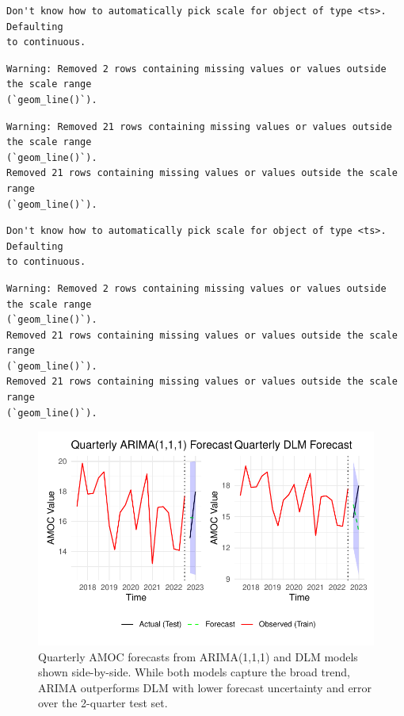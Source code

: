\documentclass[
  11pt,
]{article}
\begin{document}
\begin{verbatim}
Don't know how to automatically pick scale for object of type <ts>. Defaulting
to continuous.
\end{verbatim}

\begin{verbatim}
Warning: Removed 2 rows containing missing values or values outside the scale range
(`geom_line()`).
\end{verbatim}

\begin{verbatim}
Warning: Removed 21 rows containing missing values or values outside the scale range
(`geom_line()`).
Removed 21 rows containing missing values or values outside the scale range
(`geom_line()`).
\end{verbatim}

\begin{verbatim}
Don't know how to automatically pick scale for object of type <ts>. Defaulting
to continuous.
\end{verbatim}

\begin{verbatim}
Warning: Removed 2 rows containing missing values or values outside the scale range
(`geom_line()`).
Removed 21 rows containing missing values or values outside the scale range
(`geom_line()`).
Removed 21 rows containing missing values or values outside the scale range
(`geom_line()`).
\end{verbatim}

\begin{figure}[H]

{\centering \includegraphics{project_files/figure-pdf/fig-quarterlyforecast-1.pdf}

}

\caption{Quarterly AMOC forecasts from ARIMA(1,1,1) and DLM models shown
side-by-side. While both models capture the broad trend, ARIMA
outperforms DLM with lower forecast uncertainty and error over the
2-quarter test set.}

\end{figure}%
\end{document}
